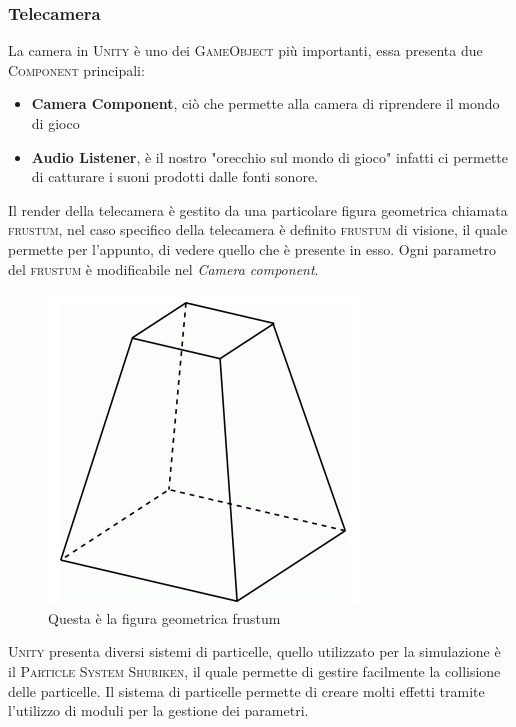 \documentclass[12pt, openany]{book}
\begin{document}
	\subsubsection{Telecamera}
	La camera in \textsc{Unity} è uno dei \textsc{GameObject} più importanti, essa presenta due \textsc{Component} principali:
	\begin{itemize}
		\item \textbf{Camera Component}, ciò che permette alla camera di riprendere il mondo di gioco
		\item \textbf{Audio Listener}, è il nostro "orecchio sul mondo di gioco" infatti ci permette di catturare i suoni prodotti dalle fonti sonore.
	\end{itemize}
	Il render della telecamera è gestito da una particolare figura geometrica chiamata \textsc{frustum}, nel caso specifico della telecamera è definito \textsc{frustum} di visione, il quale permette per l'appunto, di vedere quello che è presente in esso. Ogni parametro del \textsc{frustum} è modificabile nel \emph{Camera component}.
	\begin{figure}[H]
		\centering
		\includegraphics[width=0.5\linewidth]{"Immagini/frustum.png"}
		\caption{Questa è la figura geometrica frustum}
		\label{fig:frustum}
	\end{figure}
		\textsc{Unity} presenta diversi sistemi di particelle, quello utilizzato per la simulazione è il \textsc{Particle System Shuriken}, il quale permette di gestire facilmente la collisione delle particelle. Il sistema di particelle permette di creare molti effetti tramite l'utilizzo di moduli per la gestione dei parametri.
\end{document}
